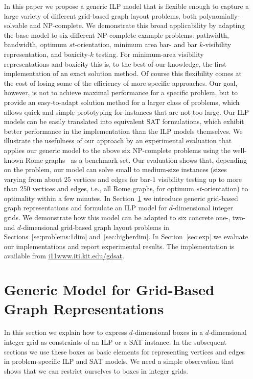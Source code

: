 \documentclass[runningheads]{llncs}
\newcounter{constr}
\begin{document}
In this paper we propose a generic ILP model that is flexible enough
to capture a large variety of different grid-based graph layout
problems, both polynomially-solvable and NP-complete. We demonstrate
this broad applicability by adapting the base model to six different
NP-complete example problems: pathwidth, bandwidth, optimum
$st$-orientation, minimum area bar- and bar $k$-visibility representation, and boxicity-$k$ testing. 
For minimum-area visibility representations and boxicity this is, to the best of our knowledge, the first implementation of an exact solution
method.
Of course this flexibility comes at the cost of losing some of the
efficiency of more specific approaches. Our goal, however, is not to
achieve maximal performance for a specific problem, but to provide an
easy-to-adapt solution method for a larger class of problems, which
allows quick and simple prototyping for instances that are not too
large. Our ILP models can be easily translated into equivalent SAT
formulations, which exhibit better performance in the implementation
than the ILP models themselves. We illustrate the usefulness of our
approach by an experimental evaluation that applies our generic model
to the above six NP-complete problems using the well-known Rome
graphs~\cite{rome} as a benchmark set. Our evaluation shows that,
depending on the problem, our model can solve small to medium-size
instances (sizes varying from about 25 vertices and edges for bar-$1$
visibility testing up to more than 250 vertices and edges, i.e., all
Rome graphs, for optimum $st$-orientation) to optimality within a few
minutes. 
In Section~\ref{sec:genericmodel} we introduce generic grid-based
graph representations and formulate an ILP model for $d$-dimensional
integer grids. We demonstrate how this model can be adapted to six
concrete one-, two- and $d$-dimensional grid-based graph layout
problems in Sections~\ref{se:problems:1dim} and~\ref{sec:higherdim}.
In Section~\ref{sec:exp} we evaluate our implementations and report
experimental results. The implementation is available from
\url{i11www.iti.kit.edu/gdsat}. 
 

\section{Generic Model for Grid-Based Graph Representations}\label{sec:genericmodel}

In this section we explain how to express $d$-dimensional boxes in a
$d$-dimensional integer grid as constraints of an ILP or a SAT
instance. In the subsequent sections we use these boxes as
basic elements for representing vertices and edges in problem-specific ILP and SAT models.
We need a simple observation that shows that we can restrict ourselves
to boxes in integer grids.
\end{document}
